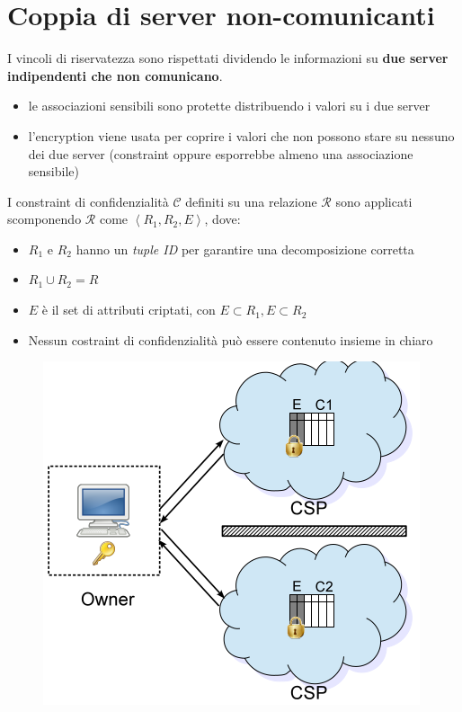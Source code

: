 \documentclass{report}
\begin{document}
\section{Coppia di server non-comunicanti}
I vincoli di riservatezza sono rispettati dividendo le informazioni
su \textbf{due server indipendenti che non comunicano}.
\begin{itemize}
    \item le associazioni sensibili sono protette distribuendo i valori su 
    i due server 
    \item l'encryption viene usata per coprire i valori che non possono stare su nessuno dei due server (constraint oppure 
    esporrebbe almeno una associazione sensibile)
\end{itemize}

I constraint di confidenzialità $\mathcal{C}$ definiti su una relazione 
$\mathcal{R}$ sono applicati scomponendo $\mathcal{R}$ come $\left\langle R_1, R_2, E \right\rangle$, dove:
\begin{itemize}
    \item $R_1$ e $R_2$ hanno un \textit{tuple ID} per garantire una decomposizione corretta 
    \item $R_1 \cup R_2 = R $
    \item $E$ è il set di attributi criptati, con $E \subset R_1, E \subset R_2$
    \item Nessun costraint di confidenzialità può essere contenuto insieme in chiaro  
\end{itemize}

\begin{figure}[ht]
    \centering
    \includegraphics[width=0.5\linewidth]{images/encryption-fragmentation/couple-frag.png}
\end{figure}
\end{document}
